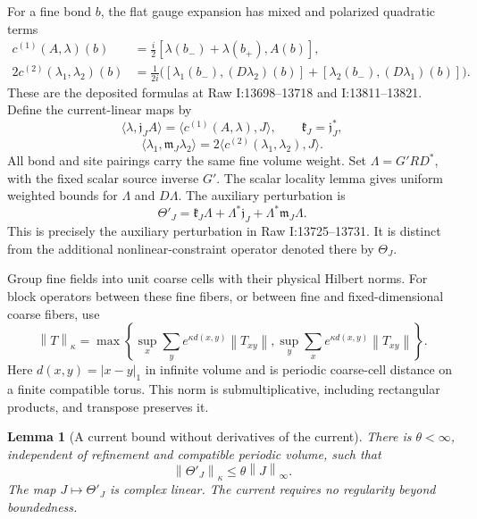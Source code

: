 \documentclass[11pt]{article}
\newtheorem{lemma}[theorem]{Lemma}
\theoremstyle{remark}
\newcommand{\norm}[1]{\left\|#1\right\|}
\begin{document}
For a fine bond $b$, the flat gauge expansion has mixed and polarized
quadratic terms
\begin{align}
 c^{(1)}(A,\lambda)(b)
 &=\frac{i}{2}[\lambda(b_-)+\lambda(b_+),A(b)],
 \label{current-c1}\\
 2c^{(2)}(\lambda_1,\lambda_2)(b)
 &=\frac{1}{2i}\bigl(
 [\lambda_1(b_-),(D\lambda_2)(b)]
 +[\lambda_2(b_-),(D\lambda_1)(b)]\bigr).
 \label{current-c2}
\end{align}
These are the deposited formulas at Raw I:13698--13718 and
I:13811--13821. Define the current-linear maps by
\[
 \langle\lambda,\mathfrak j_J A\rangle
   =\langle c^{(1)}(A,\lambda),J\rangle,
 \qquad \mathfrak k_J=\mathfrak j_J^*,
\]
\[
 \langle\lambda_1,\mathfrak m_J\lambda_2\rangle
   =2\langle c^{(2)}(\lambda_1,\lambda_2),J\rangle.
\]
All bond and site pairings carry the same fine volume weight.
Set $\Lambda=G'RD^*$, with the fixed scalar source inverse $G'$.
The scalar locality lemma gives uniform weighted bounds for
$\Lambda$ and $D\Lambda$. The auxiliary perturbation is
\begin{equation}
 \Theta'_J=\mathfrak k_J\Lambda+
       \Lambda^*\mathfrak j_J+\Lambda^*\mathfrak m_J\Lambda.
 \label{current-theta-definition}
\end{equation}
This is precisely the auxiliary perturbation in Raw I:13725--13731.
It is distinct from the additional nonlinear-constraint operator
denoted there by $\Theta_J$.

Group fine fields into unit coarse cells with their physical Hilbert
norms. For block operators between these fine fibers, or between
fine and fixed-dimensional coarse fibers, use
\begin{equation}
 \norm{T}_\kappa=
 \max\left\{
   \sup_x\sum_y e^{\kappa d(x,y)}\norm{T_{xy}},
   \sup_y\sum_x e^{\kappa d(x,y)}\norm{T_{xy}}
 \right\}.
 \label{current-schur-norm}
\end{equation}
Here $d(x,y)=|x-y|_1$ in infinite volume and is periodic coarse-cell
distance on a finite compatible torus. This norm is submultiplicative,
including rectangular products, and transpose preserves it.

\begin{lemma}[A current bound without derivatives of the current]
\label{current-theta-bound}
There is $\theta<\infty$, independent of refinement and compatible
periodic volume, such that
\begin{equation}
 \norm{\Theta'_J}_\kappa\le\theta\norm{J}_\infty.
 \label{current-theta-norm}
\end{equation}
The map $J\mapsto\Theta'_J$ is complex linear. The current requires no
regularity beyond boundedness.
\end{lemma}
\end{document}
